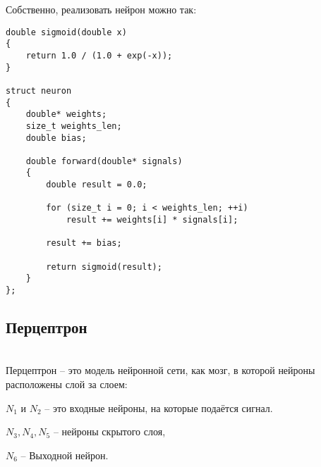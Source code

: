\documentclass{article}
\begin{document}
        Собственно, реализовать нейрон можно так:

        
        \lstset{language=C}
        \begin{lstlisting}
double sigmoid(double x)
{
    return 1.0 / (1.0 + exp(-x));
}

struct neuron
{
    double* weights;
    size_t weights_len;
    double bias;

    double forward(double* signals)
    {
        double result = 0.0;

        for (size_t i = 0; i < weights_len; ++i)
            result += weights[i] * signals[i];
        
        result += bias;

        return sigmoid(result);
    }
};
        \end{lstlisting}


        \subsection{Перцептрон}
        \ \\

        Перцептрон -- это модель нейронной сети,
        как мозг, в которой нейроны
        расположены слой за слоем:

        \figneuralnetworksmall
        
        $N_1$ и $N_2$ -- это входные нейроны, на которые подаётся сигнал.


        $N_3, N_4, N_5$ -- нейроны скрытого слоя,
        

        $N_6$ -- Выходной нейрон.\\




        
        
        
\end{document}
